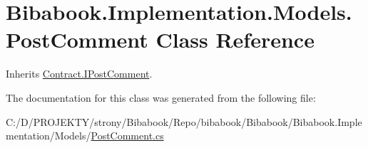 \hypertarget{class_bibabook_1_1_implementation_1_1_models_1_1_post_comment}{}\section{Bibabook.\+Implementation.\+Models.\+Post\+Comment Class Reference}
\label{class_bibabook_1_1_implementation_1_1_models_1_1_post_comment}


Inherits \hyperlink{interface_contract_1_1_i_post_comment}{Contract.\+I\+Post\+Comment}.



The documentation for this class was generated from the following file\+:\begin{DoxyCompactItemize}
\item 
C\+:/\+D/\+P\+R\+O\+J\+E\+K\+T\+Y/strony/\+Bibabook/\+Repo/bibabook/\+Bibabook/\+Bibabook.\+Implementation/\+Models/\hyperlink{_post_comment_8cs}{Post\+Comment.\+cs}\end{DoxyCompactItemize}
